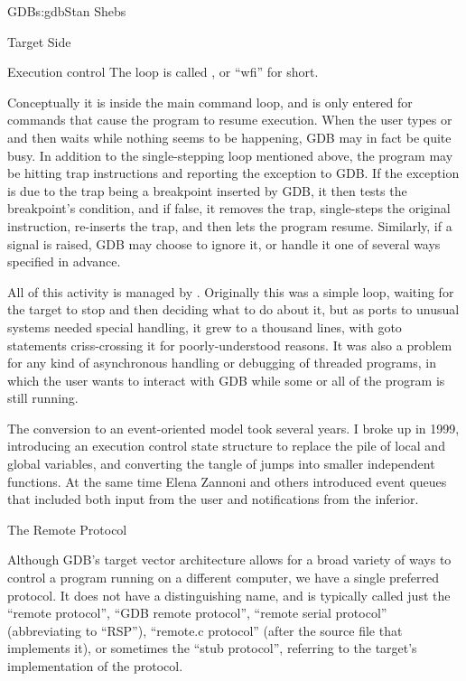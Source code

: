 \begin{aosachapter}{GDB}{s:gdb}{Stan Shebs}
\begin{aosasect1}{Target Side}
\begin{aosasect2}{Execution control}
The loop is called , or ``wfi'' for short.

Conceptually it is inside the main command loop, and is only entered
for commands that cause the program to resume execution.  When the
user types  or  and then waits while nothing seems
to be happening, GDB may in fact be quite busy.  In addition to the
single-stepping loop mentioned above, the program may be hitting trap
instructions and reporting the exception to GDB.  If the exception is
due to the trap being a breakpoint inserted by GDB, it then tests the
breakpoint's condition, and if false, it removes the trap,
single-steps the original instruction, re-inserts the trap, and then
lets the program resume.  Similarly, if a signal is raised, GDB may
choose to ignore it, or handle it one of several ways specified in
advance.

All of this activity is managed by .
Originally this was a simple loop, waiting for the target to stop and
then deciding what to do about it, but as ports to unusual systems
needed special handling, it grew to a thousand lines, with goto
statements criss-crossing it for poorly-understood reasons.  It was
also a problem for any kind of asynchronous handling or debugging of
threaded programs, in which the user wants to interact with GDB while
some or all of the program is still running.

The conversion to an event-oriented model took several years.  I broke
up  in 1999, introducing an execution control state
structure to replace the pile of local and global variables, and
converting the tangle of jumps into smaller independent functions.  At
the same time Elena Zannoni and others introduced event queues that
included both input from the user and notifications from the inferior.

\end{aosasect2}

\begin{aosasect2}{The Remote Protocol}

Although GDB's target vector architecture allows for a broad variety
of ways to control a program running on a different computer, we have
a single preferred protocol.  It does not have a distinguishing name,
and is typically called just the ``remote protocol'', ``GDB remote
protocol'', ``remote serial protocol'' (abbreviating to ``RSP''),
``remote.c protocol'' (after the source file that implements it), or
sometimes the ``stub protocol'', referring to the target's
implementation of the protocol.


\end{aosasect2}
\end{aosasect1}
\end{aosachapter}
